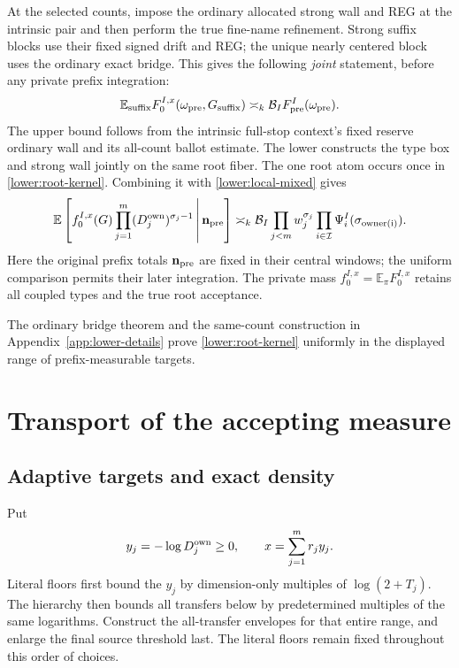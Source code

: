 At the selected counts, impose the ordinary allocated strong wall
and REG at the intrinsic pair and then perform the true fine-name
refinement.  Strong suffix blocks use their fixed signed drift and
REG; the unique nearly centered block uses the ordinary exact bridge.
This gives the following \emph{joint} statement, before any private
prefix integration:
\begin{equation}
 \mathbb E_{\rm suffix}
 F_0^{I,x}(\omega_{\rm pre},G_{\rm suffix})
       \asymp_k\mathcal B_I F_{\rm pre}^I(\omega_{\rm pre}).
 \label{lower:root-kernel}
\end{equation}
The upper bound follows from the intrinsic full-stop context's fixed
reserve ordinary wall and its all-count ballot estimate.  The lower
constructs the type box and strong wall jointly on the same root fiber.
The one root atom occurs once in \eqref{lower:root-kernel}.
Combining it with \eqref{lower:local-mixed} gives
\begin{equation}
 \mathbb E\left[f_0^{I,x}(G)
                    \prod_{j=1}^m(D_j^{\rm own})^{\sigma_j-1}
                    \,\middle|\,\mathbf n_{\rm pre}\right]
 \asymp_k\mathcal B_I\prod_{j<m}w_j^{\sigma_j}
                       \prod_{i\in\mathcal I}\Psi_i^I(\sigma_{\rm owner(i)}).
 \label{lower:source-mixed}
\end{equation}
Here the original prefix totals $\mathbf n_{\rm pre}$ are fixed in
their central windows; the uniform comparison permits their later
integration.  The private mass $f_0^{I,x}=\mathbb E_\pi F_0^{I,x}$
retains all coupled types and the true root acceptance.

The ordinary bridge theorem and the same-count construction in
Appendix~\ref{app:lower-details} prove \eqref{lower:root-kernel} uniformly
in the displayed range of prefix-measurable targets.

\section{Transport of the accepting measure}\label{paper:transport}
\subsection{Adaptive targets and exact density}
\label{lower:transport}
Put
\begin{equation}
 y_j=-\log D_j^{\rm own}\geq0,\qquad
 x=\sum_{j=1}^m r_jy_j.
 \label{lower:targets}
\end{equation}
Literal floors first bound the $y_j$ by dimension-only multiples of
$\log(2+T_j)$.  The hierarchy then bounds all transfers below by
predetermined multiples of the same logarithms.  Construct the
all-transfer envelopes for that entire range, and enlarge the final
source threshold last.  The literal floors remain fixed throughout
this order of choices.

